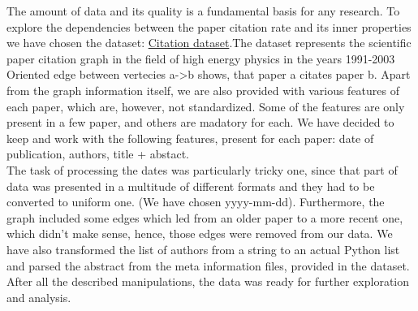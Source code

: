 \documentclass{article}
\newcommand\tab[1][1cm]{\hspace*{#1}}
\begin{document}
\tab	The amount of data and its quality is a fundamental basis for any research. To explore the dependencies between the paper citation rate and its inner properties we have chosen the dataset: \href{https://www.kaggle.com/datasets/wolfram77/graphs-snap-cit}{Citation dataset}.The dataset represents the scientific paper citation graph in the field of high energy physics in the years 1991-2003 \\
\tab	 Oriented edge between vertecies a->b shows, that paper a citates paper b. Apart from the graph information itself, we are also provided with various features of each paper, which are, however, not standardized. Some of the features are only present in a few paper, and others are madatory for each. We have decided to keep and work with the following features, present for each paper: date of publication, authors, title + abstact. \\
\tab	The task of processing the dates was particularly tricky one, since that part of data was presented in a multitude of different formats and they had to be converted to uniform one. (We have chosen yyyy-mm-dd). Furthermore, the graph included some edges which led from an older paper to a more recent one, which didn't make sense, hence, those edges were removed from our data. We have also transformed the list of authors from a string to an actual Python list and parsed the abstract from the meta information files, provided in the dataset. \\
\tab	After all the described manipulations, the data was ready for further exploration and analysis. \\
\end{document}
